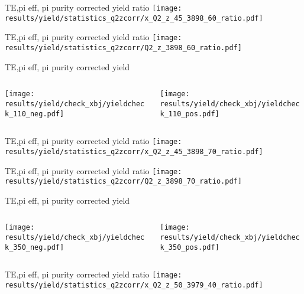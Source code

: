\begin{frame}{TE,pi eff, pi purity corrected yield ratio}
\texttt{[image: results/yield/statistics\_q2zcorr/x\_Q2\_z\_45\_3898\_60\_ratio.pdf]}
\end{frame}
\begin{frame}{TE,pi eff, pi purity corrected yield ratio}
\texttt{[image: results/yield/statistics\_q2zcorr/Q2\_z\_3898\_60\_ratio.pdf]}
\end{frame}
\begin{frame}{TE,pi eff, pi purity corrected yield}
\begin{columns}
\begin{column}[T]{0.5\textwidth}
\texttt{[image: results/yield/check\_xbj/yieldcheck\_110\_neg.pdf]}
\end{column}
\begin{column}[T]{0.5\textwidth}
\texttt{[image: results/yield/check\_xbj/yieldcheck\_110\_pos.pdf]}
\end{column}
\end{columns}
\end{frame}
\begin{frame}{TE,pi eff, pi purity corrected yield ratio}
\texttt{[image: results/yield/statistics\_q2zcorr/x\_Q2\_z\_45\_3898\_70\_ratio.pdf]}
\end{frame}
\begin{frame}{TE,pi eff, pi purity corrected yield ratio}
\texttt{[image: results/yield/statistics\_q2zcorr/Q2\_z\_3898\_70\_ratio.pdf]}
\end{frame}
\begin{frame}{TE,pi eff, pi purity corrected yield}
\begin{columns}
\begin{column}[T]{0.5\textwidth}
\texttt{[image: results/yield/check\_xbj/yieldcheck\_350\_neg.pdf]}
\end{column}
\begin{column}[T]{0.5\textwidth}
\texttt{[image: results/yield/check\_xbj/yieldcheck\_350\_pos.pdf]}
\end{column}
\end{columns}
\end{frame}
\begin{frame}{TE,pi eff, pi purity corrected yield ratio}
\texttt{[image: results/yield/statistics\_q2zcorr/x\_Q2\_z\_50\_3979\_40\_ratio.pdf]}
\end{frame}

